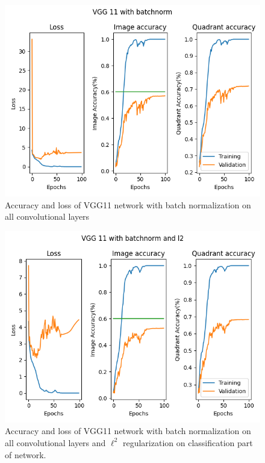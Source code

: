 \documentclass{article}
\begin{document}
\begin{figure}[h]
    \begin{center}
        \includegraphics{../Task3/Figures/VGG11withbatchnorm.png}
        \caption{Accuracy and loss of VGG11 network with batch normalization on all convolutional layers}
        \label{fig::vgg11bn}
    \end{center}
\end{figure}
\begin{figure}[h]
    \begin{center}
        \includegraphics{../Task3/Figures/VGG11withbatchnormandl2.png}
        \caption{Accuracy and loss of VGG11 network with batch normalization on all convolutional layers and $\ell^2$ regularization on classification part of network.}
        \label{fig::vgg11bnl2}
    \end{center}
\end{figure}
\end{document}
